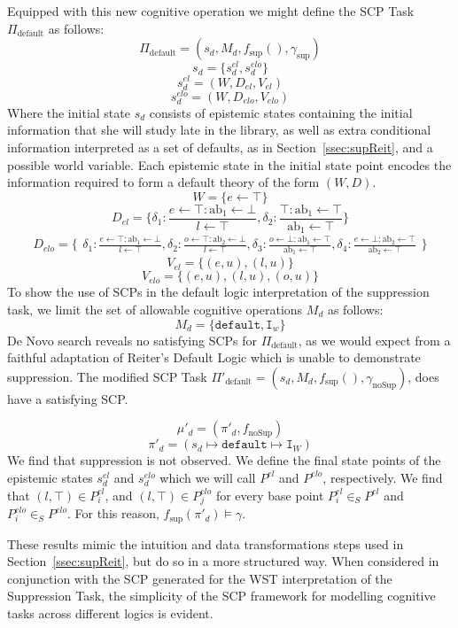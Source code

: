 Equipped with this new cognitive operation we might define the SCP Task $\Pi_\text{default}$ as follows:
\[\Pi_\text{default}=(s_d,M_d,f_\text{sup}(),\gamma_\text{sup})\]
\[s_d=\{s_d^{el}, s_d^{elo}\}\]
\[s_d^{el}=(W,D_{el},V_{el})\]
\[s_d^{elo}=(W,D_{elo},V_{elo})\]
Where the initial state $s_d$ consists of epistemic states containing the initial information that she will study late in the library, as well as extra conditional information interpreted as a set of defaults, as in Section~\ref{ssec:supReit}, and a possible world variable. Each epistemic state in the initial state point encodes the information required to form a default theory of the form $(W,D)$.
\[W=\{e\leftarrow \top\}\]
\[
D_{el}=\{\delta_1:\frac{e\leftarrow \top:\text{ab}_1 \leftarrow \bot}{l\leftarrow\top} ,
\delta_2:\frac{\top:\text{ab}_1 \leftarrow \top}{\text{ab}_1\leftarrow\top}
\}
\]
\[
D_{elo}=\{\begin{matrix}\delta_1:\frac{e\leftarrow \top:\text{ab}_1 \leftarrow \bot}{l\leftarrow\top} ,
\delta_2:\frac{o\leftarrow \top:\text{ab}_2 \leftarrow \bot}{l\leftarrow\top},
\delta_3:\frac{o\leftarrow \bot:\text{ab}_1 \leftarrow \top}{\text{ab}_1\leftarrow\top},
\delta_4:\frac{e\leftarrow \bot:\text{ab}_2 \leftarrow \top}{\text{ab}_2\leftarrow\top}
\end{matrix}\}
\]
\[V_{el}=\{(e,u),(l,u)\}\]
\[V_{elo}=\{(e,u),(l,u), (o,u)\}\]
To show the use of SCPs in the default logic interpretation of the suppression task, we limit the set of allowable cognitive operations $M_d$ as follows:
\[M_d=\{\texttt{default},\texttt{I}_w\}\]
De Novo search reveals no satisfying SCPs for $\Pi_\text{default}$, as we would expect from a faithful adaptation of Reiter's Default Logic which is unable to demonstrate suppression. The modified SCP Task $\Pi'_\text{default}=(s_d,M_d,f_\text{sup}(),\gamma_\text{noSup})$, does have a satisfying SCP.

\[\mu'_d=(\pi'_d, f_\text{noSup})\]
\[\pi'_d=(s_d \longmapsto \texttt{default} \longmapsto \texttt{I}_W)\]
We find that suppression is not observed. We define the final state points of the epistemic states $s_d^{el}$ and $s_d^{elo}$ which we will call $P^{el}$ and $P^{elo}$, respectively. We find that $(l, \top) \in P^{el}_i$, and $(l, \top) \in P^{elo}_j$ for every base point $P^{el}_i \in_S P^{el}$ and $P^{elo}_i \in_S P^{elo}$. For this reason, $f_\text{sup}(\pi'_d) \models \gamma$. 

These results mimic the intuition and data transformations steps used in Section~\ref{ssec:supReit}, but do so in a more structured way. When considered in conjunction with the SCP generated for the WST interpretation of the Suppression Task, the simplicity of the SCP framework for modelling cognitive tasks across different logics is evident.

